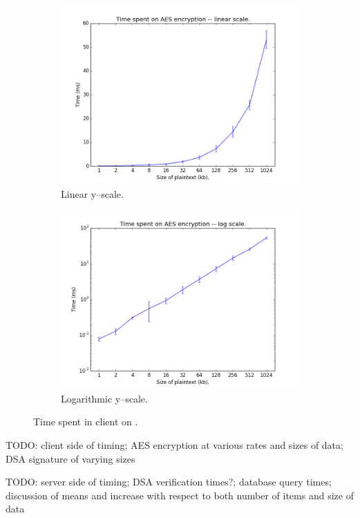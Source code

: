 \begin{figure}
\centering
\begin{subfigure}{.5\textwidth}
  \centering
  \includegraphics[width=1.1\linewidth]{images/aes_linear}
  \caption{Linear y--scale.}
\end{subfigure}%
\begin{subfigure}{.5\textwidth}
  \centering
  \includegraphics[width=1.1\linewidth]{images/aes_log}
  \caption{Logarithmic y--scale.}
\end{subfigure}
\caption{Time spent in client on .}
\label{fig:aes}
\end{figure}

TODO: client side of timing; AES encryption at various rates and sizes of data; DSA signature of varying sizes

TODO: server side of timing; DSA verification times?; database query times; discussion of means and increase with respect to both number of items and size of data
